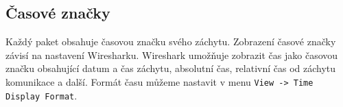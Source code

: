 \subsection{Časové značky}
Každý paket obsahuje časovou značku svého záchytu. Zobrazení časové značky závisí na nastavení Wiresharku. Wireshark umožňuje zobrazit čas jako časovou značku obsahující datum a čas záchytu, absolutní čas, relativní čas od záchytu komunikace a další. Formát času můžeme nastavit v menu \texttt{View -> Time Display Format}.
